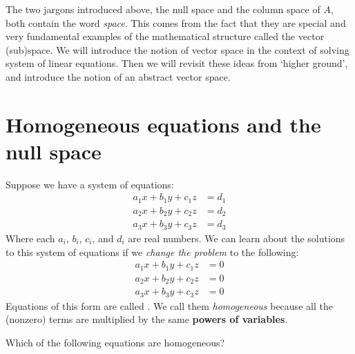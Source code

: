 \documentclass{ximera}
\begin{document}
The two jargons introduced above, the null space and the column space
of $A$, both contain the word \textit{space}. This comes from the fact
that they are special and very fundamental examples of the
mathematical structure called the vector (sub)space. We will introduce
the notion of vector space in the context of solving system of linear
equations. Then we will revisit these ideas from `higher ground', and
introduce the notion of an abstract vector space.

\section{Homogeneous equations and the null space}
Suppose we have a system of equations:
\begin{align*}
  a_1 x + b_1 y + c_1 z &= d_1\\
  a_2 x + b_2 y + c_2 z &= d_2\\
  a_3 x + b_3 y + c_3 z &= d_3
\end{align*}
Where each $a_i$, $b_i$, $c_i$, and $d_i$ are real numbers. We can
learn about the solutions to this system of equations if we
\textit{change the problem} to the following:
\begin{align*}
  a_1 x + b_1 y + c_1 z &= 0  \\
  a_2 x + b_2 y + c_2 z &= 0  \\
  a_3 x + b_3 y + c_3 z &= 0
\end{align*}
Equations of this form are called . We call
them \textit{homogeneous} because all the (nonzero) terms are
multiplied by the same \textbf{powers of variables}.


\begin{question}
  Which of the following equations are homogeneous?
  \begin{selectAll}
  \end{selectAll}
\end{question}
\end{document}
